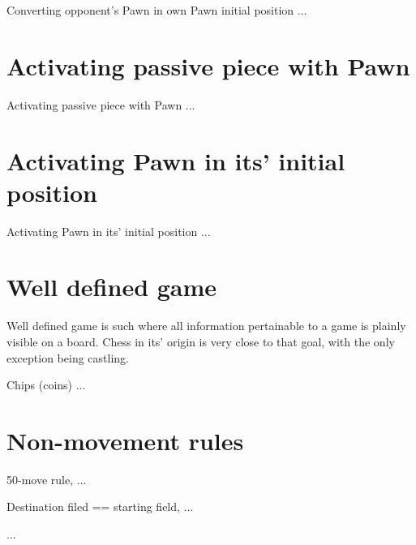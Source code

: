 Converting opponent's Pawn in own Pawn initial position ...

\section*{Activating passive piece with Pawn}

Activating passive piece with Pawn ...


\section*{Activating Pawn in its' initial position}

Activating Pawn in its' initial position ...

\section*{Well defined game}

Well defined game is such where all information pertainable to a game
is plainly visible on a board. Chess in its' origin is very close to
that goal, with the only exception being castling.

Chips (coins) ...

\section*{Non-movement rules}

50-move rule, ...

Destination filed == starting field, ...

...

\clearpage %
